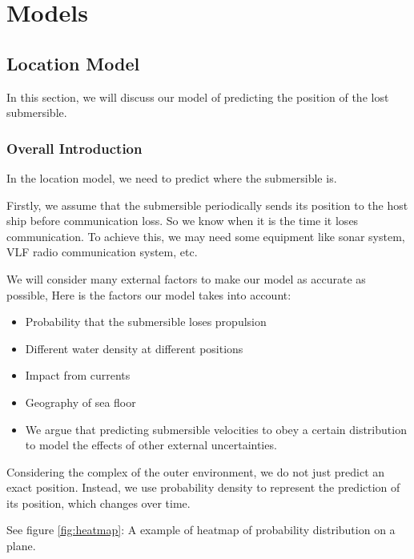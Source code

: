 \documentclass[12pt]{article}
\begin{document}
\section{Models}
\subsection{Location Model}
In this section, we will discuss our model of predicting the position of the lost submersible.
\subsubsection{Overall Introduction}
In the location model, we need to predict where the submersible is. 

Firstly, we assume that the submersible periodically sends its position to the host ship before communication loss. So we know when it is the time it loses communication. To achieve this, we may need some equipment like sonar system, VLF radio communication system, etc.\cite{communication methods}

We will consider many external factors to make our model as accurate as possible, Here is the factors our model takes into account: 

\begin{itemize}
    \item Probability that the submersible loses propulsion
    \item Different water density at different positions
    \item Impact from currents
    \item Geography of sea floor
    \item We argue that predicting submersible velocities to obey a certain distribution to model the effects of other external uncertainties.
\end{itemize}

Considering the complex of the outer environment, we do not just predict an exact position. Instead, we use probability density to represent the prediction of its position, which changes over time. 

See figure \ref{fig:heatmap}: A example of heatmap of probability distribution on a plane.
\end{document}

